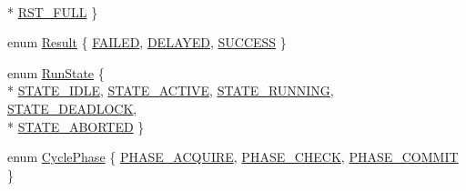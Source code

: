 \begin{DoxyCompactItemize}
\\*
\hyperlink{namespace_simulator_a0400735ff32412cb8ce9506b81492c69ab3341e2175253ca89ba079a5d93b4d55}{R\+S\+T\+\_\+\+F\+U\+L\+L}
 \}
\item 
enum \hyperlink{namespace_simulator_a4b6b5616e7236c0c131516a441776805}{Result} \{ \hyperlink{namespace_simulator_a4b6b5616e7236c0c131516a441776805ac03aea58b07adc88b153c32324457a31}{F\+A\+I\+L\+E\+D}, 
\hyperlink{namespace_simulator_a4b6b5616e7236c0c131516a441776805a725f04607c7a90c4c824167db1e92445}{D\+E\+L\+A\+Y\+E\+D}, 
\hyperlink{namespace_simulator_a4b6b5616e7236c0c131516a441776805a55d03717e487d891d2907c8f7e4898bc}{S\+U\+C\+C\+E\+S\+S}
 \}
\item 
enum \hyperlink{namespace_simulator_a7b6594cd8ea507163ee6e4d4db4ddad5}{Run\+State} \{ \\*
\hyperlink{namespace_simulator_a7b6594cd8ea507163ee6e4d4db4ddad5aa650640641039eda5e0017ffe709c5b0}{S\+T\+A\+T\+E\+\_\+\+I\+D\+L\+E}, 
\hyperlink{namespace_simulator_a7b6594cd8ea507163ee6e4d4db4ddad5a0a9ade738cc03bee74f8a863f008a0b7}{S\+T\+A\+T\+E\+\_\+\+A\+C\+T\+I\+V\+E}, 
\hyperlink{namespace_simulator_a7b6594cd8ea507163ee6e4d4db4ddad5adee144396b83f26168934115a5b4e694}{S\+T\+A\+T\+E\+\_\+\+R\+U\+N\+N\+I\+N\+G}, 
\hyperlink{namespace_simulator_a7b6594cd8ea507163ee6e4d4db4ddad5abdf69556cb72c548a7f23a243586fb39}{S\+T\+A\+T\+E\+\_\+\+D\+E\+A\+D\+L\+O\+C\+K}, 
\\*
\hyperlink{namespace_simulator_a7b6594cd8ea507163ee6e4d4db4ddad5ac4f0787aea0096785fa988e1eda9e8ea}{S\+T\+A\+T\+E\+\_\+\+A\+B\+O\+R\+T\+E\+D}
 \}
\item 
enum \hyperlink{namespace_simulator_afd4b64cfd93793eb135bdb1a3c58c238}{Cycle\+Phase} \{ \hyperlink{namespace_simulator_afd4b64cfd93793eb135bdb1a3c58c238aad4c724d6751f83f32cec7d577cf1bc1}{P\+H\+A\+S\+E\+\_\+\+A\+C\+Q\+U\+I\+R\+E}, 
\hyperlink{namespace_simulator_afd4b64cfd93793eb135bdb1a3c58c238a68e418e6471b0b48cce4935debfae5d5}{P\+H\+A\+S\+E\+\_\+\+C\+H\+E\+C\+K}, 
\hyperlink{namespace_simulator_afd4b64cfd93793eb135bdb1a3c58c238a92a90e3acbd630e23d450e1bd4b2377d}{P\+H\+A\+S\+E\+\_\+\+C\+O\+M\+M\+I\+T}
 \}
\end{DoxyCompactItemize}
